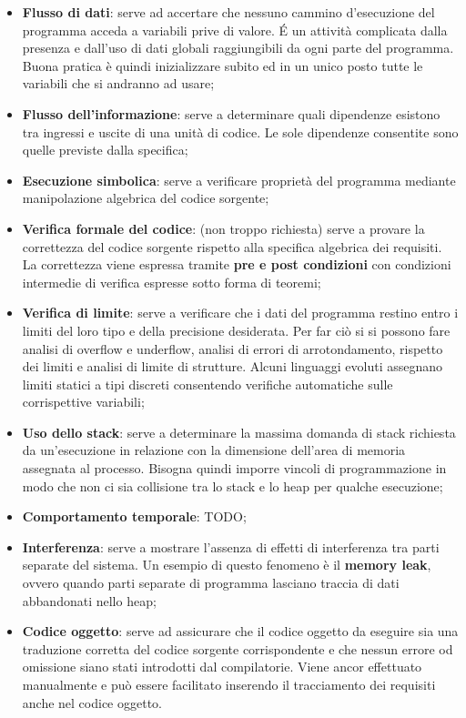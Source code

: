 \begin{itemize}
\begin{itemize}
				\item \textbf{Flusso di dati}: serve ad accertare che nessuno cammino d'esecuzione del programma acceda a variabili prive di valore. \'E un attività complicata dalla presenza e dall'uso di dati globali raggiungibili da ogni parte del programma. Buona pratica è quindi inizializzare subito ed in un unico posto tutte le variabili che si andranno ad usare;
				\item \textbf{Flusso dell'informazione}: serve a determinare quali dipendenze esistono tra ingressi e uscite di una unità di codice. Le sole dipendenze consentite sono quelle previste dalla specifica;
				\item \textbf{Esecuzione simbolica}: serve a verificare proprietà del programma mediante manipolazione algebrica del codice sorgente;
				\item \textbf{Verifica formale del codice}: (non troppo richiesta) serve a provare la correttezza del codice sorgente rispetto alla specifica algebrica dei requisiti. La correttezza viene espressa tramite \textbf{pre e post condizioni} con condizioni intermedie di verifica espresse sotto forma di teoremi;
				\item \textbf{Verifica di limite}: serve a verificare che i dati del programma restino entro i limiti del loro tipo e della precisione desiderata. Per far ciò si si possono fare analisi di overflow e underflow, analisi di errori di arrotondamento, rispetto dei limiti e analisi di limite di strutture. Alcuni linguaggi evoluti assegnano limiti statici a tipi discreti consentendo verifiche automatiche sulle corrispettive variabili;
				\item \textbf{Uso dello stack}: serve a determinare la massima domanda di stack richiesta da un'esecuzione in relazione con la dimensione dell'area di memoria assegnata al processo. Bisogna quindi imporre vincoli di programmazione in modo che non ci sia collisione tra lo stack e lo heap per qualche esecuzione;
				\item \textbf{Comportamento temporale}: TODO;
				\item \textbf{Interferenza}: serve a mostrare l'assenza di effetti di interferenza tra parti separate del sistema. Un esempio di questo fenomeno è il \textbf{memory leak}, ovvero quando parti separate di programma lasciano traccia di dati abbandonati nello heap;
				\item \textbf{Codice oggetto}: serve ad assicurare che il codice oggetto da eseguire sia una traduzione corretta del codice sorgente corrispondente e che nessun errore od omissione siano stati introdotti dal compilatorie. Viene ancor effettuato manualmente e può essere facilitato inserendo il tracciamento dei requisiti anche nel codice oggetto.
			\end{itemize}





\end{itemize}

